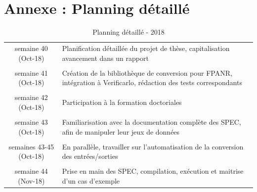 \documentclass[a4paper,11pt]{article}
\begin{document}
\section{Annexe : Planning détaillé}
\begin{table}[h]
	\caption{Planning détaillé - 2018}
	\label{planning}

	\centering
	\begin{tabular}{c|p{25em}}
		\hline
		 semaine 40 (Oct-18) & Planification détaillée du projet de thèse, capitalisation avancement dans un rapport \\ 
		 & \\
		 semaine 41 (Oct-18) & Création de la bibliothèque de conversion pour FPANR, intégration à Verificarlo, rédaction des tests correspondants \\
		 & \\
		 semaine 42 (Oct-18)	& Participation à la formation doctoriales \\
		 & \\
		 semaine 43	(Oct-18) & Familiarisation avec la documentation complète des SPEC, afin de manipuler leur jeux de données \\
		 & \\
		 semaines 43-45 (Oct-18) & En parallèle, travailler sur l'automatisation de la conversion des entrées/sorties  \\
		 & \\
		 semaine 44 (Nov-18) & Prise en main des SPEC, compilation, exécution et maitrise d'un cas d'exemple \\

\end{tabular}
\end{table}
\end{document}
